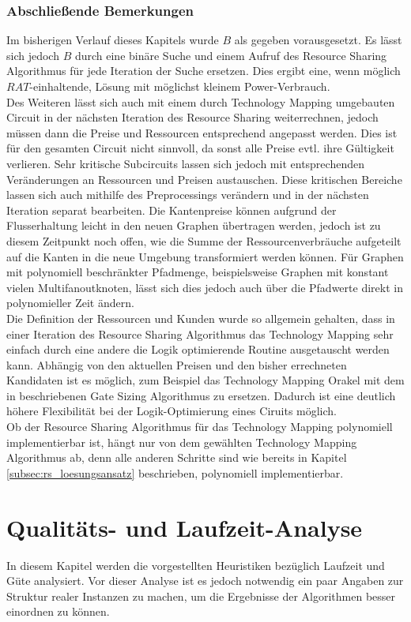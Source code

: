 \documentclass[11pt, a4paper, german]{article}
\newcommand{\TM}{Technology  Mapping }
\begin{document}
\subsubsection{Abschließende Bemerkungen}
Im bisherigen Verlauf dieses Kapitels wurde $B$ als gegeben vorausgesetzt. Es lässt sich jedoch $B$ durch eine binäre Suche und einem Aufruf des Resource Sharing Algorithmus für jede Iteration der Suche ersetzen. Dies ergibt eine, wenn möglich $RAT$-einhaltende, Lösung mit möglichst kleinem Power-Verbrauch. \\
Des Weiteren lässt sich auch mit einem durch \TM umgebauten Circuit in der nächsten Iteration des Resource Sharing weiterrechnen, jedoch müssen dann die Preise und Ressourcen entsprechend angepasst werden. Dies ist für den gesamten Circuit nicht sinnvoll, da sonst alle Preise evtl. ihre Gültigkeit verlieren. Sehr kritische Subcircuits lassen sich jedoch  mit entsprechenden Veränderungen an Ressourcen und Preisen austauschen. Diese kritischen Bereiche lassen sich auch mithilfe des Preprocessings verändern und in der nächsten Iteration separat bearbeiten. Die Kantenpreise können aufgrund der Flusserhaltung leicht in den neuen Graphen übertragen werden, jedoch ist zu diesem Zeitpunkt noch offen, wie die Summe der Ressourcenverbräuche aufgeteilt auf die Kanten in die neue Umgebung transformiert werden können. Für Graphen mit polynomiell beschränkter Pfadmenge, beispielsweise Graphen mit konstant vielen Multifanoutknoten, lässt sich dies jedoch auch über die Pfadwerte direkt in polynomieller Zeit ändern. \\
Die Definition der Ressourcen und Kunden wurde so allgemein gehalten, dass in einer Iteration des Resource Sharing Algorithmus das \TM sehr einfach durch eine andere die Logik optimierende Routine ausgetauscht werden kann. Abhängig von den aktuellen Preisen und den bisher errechneten Kandidaten ist es möglich, zum Beispiel das \TM Orakel mit  dem  in \cite{Daboul2018} beschriebenen  Gate Sizing Algorithmus zu ersetzen.  Dadurch ist eine deutlich höhere Flexibilität bei der Logik-Optimierung eines Ciruits möglich. \\
Ob der Resource Sharing Algorithmus für das \TM polynomiell implementierbar ist, hängt nur von dem gewählten \TM Algorithmus ab, denn alle anderen Schritte sind wie bereits in Kapitel \ref{subsec:rs_loesungsansatz} beschrieben, polynomiell implementierbar. 

\section{Qualitäts- und Laufzeit-Analyse}
\label{sec:analyse}
In diesem Kapitel werden die vorgestellten Heuristiken bezüglich Laufzeit und Güte analysiert. Vor dieser Analyse ist es jedoch notwendig ein paar Angaben zur Struktur realer Instanzen zu machen, um die Ergebnisse der Algorithmen besser einordnen zu können.\\
\end{document}
